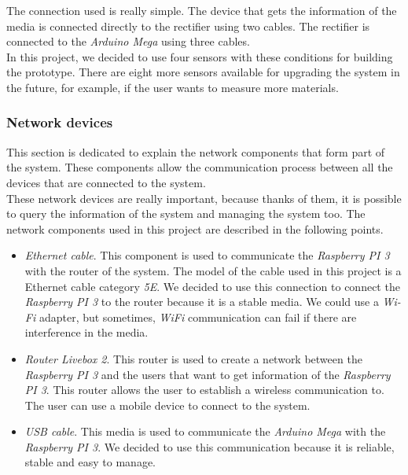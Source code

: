The connection used is really simple. The device that gets the information of the media is connected directly to the rectifier using two cables. The rectifier is connected to the \textit{Arduino Mega} using three cables.\\

In this project, we decided to use four sensors with these conditions for building the prototype. There are eight more sensors available for upgrading the system in the future, for example, if the user wants to measure more materials.

\subsubsection{Network devices}

This section is dedicated to explain the network components that form part of the system. These components allow  the communication process between all the devices that are connected to the system.\\ 

These network devices are really important, because thanks of them, it is possible to query the information of the system and managing the system too. The network components used in this project are described in the following points.\\

\begin{itemize}

\item \textit{Ethernet cable}. This component is used to communicate the \textit{Raspberry PI 3} with the router of the system. The model of the cable used in this project is a Ethernet cable category \textit{5E}. We decided to use this connection to connect the \textit{Raspberry PI 3} to the router because it is a stable media. We could use a \textit{Wi-Fi} adapter, but sometimes, \textit{WiFi} communication can fail if there are interference in the media.

\item \textit{Router Livebox 2}. This router is used to create a network between the \textit{Raspberry PI 3} and the users that want to get information of the \textit{Raspberry PI 3}. This router allows the user to establish a wireless communication to. The user can use a mobile device to connect to the system.

\item \textit{USB cable}. This media is used to communicate the \textit{Arduino Mega} with the \textit{Raspberry PI 3}. We decided to use this communication because it is reliable, stable and easy to manage.

\end{itemize}

